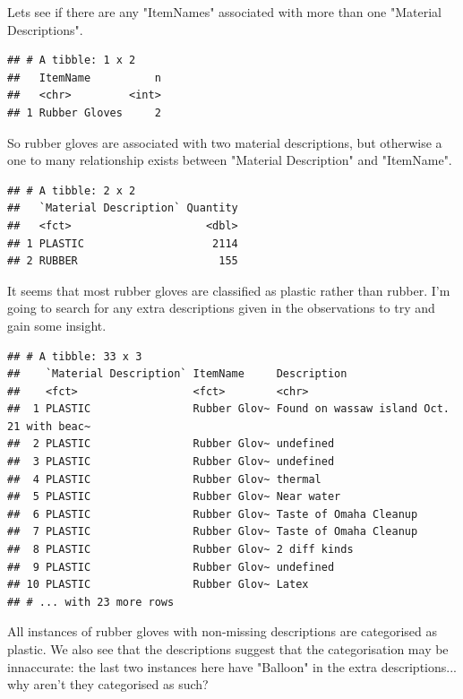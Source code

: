 \documentclass[10pt]{article}\usepackage[]{graphicx}\usepackage[]{color}
\makeatletter
\newenvironment{kframe}{%
 \def\at@end@of@kframe{}%
 \ifinner\ifhmode%
  \def\at@end@of@kframe{\end{minipage}}%
  \begin{minipage}{\columnwidth}%
 \fi\fi%
 \def\FrameCommand##1{\hskip\@totalleftmargin \hskip-\fboxsep
 \colorbox{shadecolor}{##1}\hskip-\fboxsep
     \hskip-\linewidth \hskip-\@totalleftmargin \hskip\columnwidth}%
 \MakeFramed {\advance\hsize-\width
   \@totalleftmargin\z@ \linewidth\hsize
   \@setminipage}}%
 {\par\unskip\endMakeFramed%
 \at@end@of@kframe}
\newenvironment{knitrout}{}{} %
\makeatother
\begin{document}
\begin{itemize}
Lets see if there are any "ItemNames" associated with more than one "Material Descriptions".
\begin{knitrout}
\color{fgcolor}\begin{kframe}
\begin{verbatim}
## # A tibble: 1 x 2
##   ItemName          n
##   <chr>         <int>
## 1 Rubber Gloves     2
\end{verbatim}
\end{kframe}
\end{knitrout}
So rubber gloves are associated with two material descriptions, but otherwise a one to many relationship exists between "Material Description" and "ItemName".
\begin{knitrout}
\color{fgcolor}\begin{kframe}
\begin{verbatim}
## # A tibble: 2 x 2
##   `Material Description` Quantity
##   <fct>                     <dbl>
## 1 PLASTIC                    2114
## 2 RUBBER                      155
\end{verbatim}
\end{kframe}
\end{knitrout}
It seems that most rubber gloves are classified as plastic rather than rubber. I'm going to search for any extra descriptions given in the observations to try and gain some insight.
\begin{knitrout}
\color{fgcolor}\begin{kframe}
\begin{verbatim}
## # A tibble: 33 x 3
##    `Material Description` ItemName     Description                              
##    <fct>                  <fct>        <chr>                                    
##  1 PLASTIC                Rubber Glov~ Found on wassaw island Oct. 21 with beac~
##  2 PLASTIC                Rubber Glov~ undefined                                
##  3 PLASTIC                Rubber Glov~ undefined                                
##  4 PLASTIC                Rubber Glov~ thermal                                  
##  5 PLASTIC                Rubber Glov~ Near water                               
##  6 PLASTIC                Rubber Glov~ Taste of Omaha Cleanup                   
##  7 PLASTIC                Rubber Glov~ Taste of Omaha Cleanup                   
##  8 PLASTIC                Rubber Glov~ 2 diff kinds                             
##  9 PLASTIC                Rubber Glov~ undefined                                
## 10 PLASTIC                Rubber Glov~ Latex                                    
## # ... with 23 more rows
\end{verbatim}
\end{kframe}
\end{knitrout}
All instances of rubber gloves with non-missing descriptions are categorised as plastic. We also see that the descriptions suggest that the categorisation may be innaccurate: the last two instances here have "Balloon" in the extra descriptions... why aren't they categorised as such?


\end{itemize}
\end{document}
